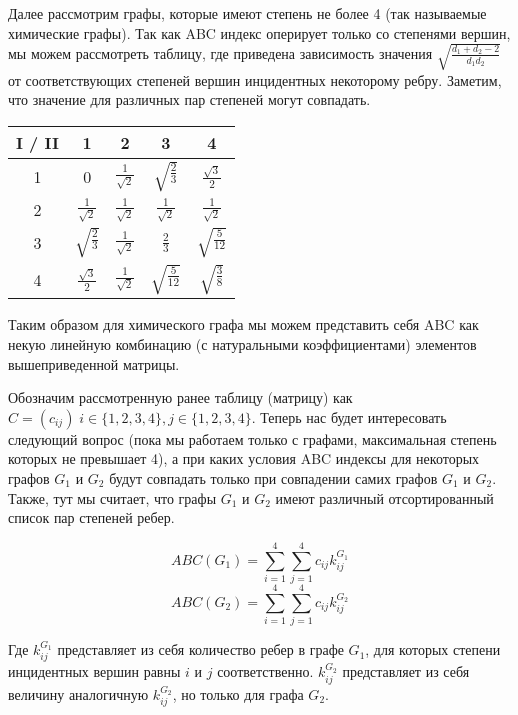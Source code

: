 \documentclass{article}
\begin{document}
Далее рассмотрим графы, которые имеют степень не более 4 (так называемые химические графы). Так как ABC индекс оперирует только со степенями вершин, мы можем рассмотреть таблицу, где приведена зависимость значения $\sqrt{\frac{d_1 + d_2 - 2}{d_1 d_2}}$ от соответствующих степеней вершин инцидентных некоторому
ребру. Заметим, что значение для различных пар степеней могут совпадать.


\begin{table}[ht]
\centering
\begin{tabular}{|c|c|c|c|c|}
\hline
I / II  & 1                    & 2                    & 3                    & 4                     \\ \hline
1                                               & 0                    & $\frac{1}{\sqrt{2}}$ & $\sqrt{\frac{2}{3}}$ & $\frac{\sqrt{3}}{2}$  \\ \hline
2                                               & $\frac{1}{\sqrt{2}}$ & $\frac{1}{\sqrt{2}}$ & $\frac{1}{\sqrt{2}}$ & $\frac{1}{\sqrt{2}}$  \\ \hline
3                                               & $\sqrt{\frac{2}{3}}$ & $\frac{1}{\sqrt{2}}$ & $\frac{2}{3}$        & $\sqrt{\frac{5}{12}}$ \\ \hline
4                                               & $\frac{\sqrt{3}}{2}$ & $\frac{1}{\sqrt{2}}$ & $\sqrt{\frac{5}{12}}$ & $\sqrt{\frac{3}{8}}$  \\ \hline
\end{tabular}
\end{table}

\newpage

Таким образом для химического графа мы можем представить себя ABC как некую линейную комбинацию (с натуральными коэффициентами) элементов вышеприведенной матрицы.


Обозначим рассмотренную ранее таблицу (матрицу) как $C = (c_{ij}) \; i \in \{1, 2, 3, 4\}, j \in \{1, 2, 3, 4\}$. Теперь нас будет интересовать следующий вопрос (пока мы работаем только с графами, максимальная степень которых не превышает 4), а при каких условия ABC индексы для некоторых графов $G_1$ и $G_2$ будут совпадать только при совпадении самих графов $G_1$ и $G_2$. Также, тут мы считает, что графы $G_1$ и $G_2$ имеют различный отсортированный список пар степеней ребер.

$$ ABC(G_1) =  \sum_{i=1}^{4} \sum_{j=1}^{4} c_{ij} k_{ij}^{G_1} $$
$$ ABC(G_2) = \sum_{i=1}^{4} \sum_{j=1}^{4} c_{ij} k_{ij}^{G_2} $$

Где $k_{ij}^{G_1}$ представляет из себя количество ребер в графе $G_1$,	для которых степени инцидентных вершин равны $i$ и $j$ соответственно. $k_{ij}^{G_2}$ представляет из себя величину аналогичную $k_{ij}^{G_2}$, но только для графа $G_2$. 
\end{document}
